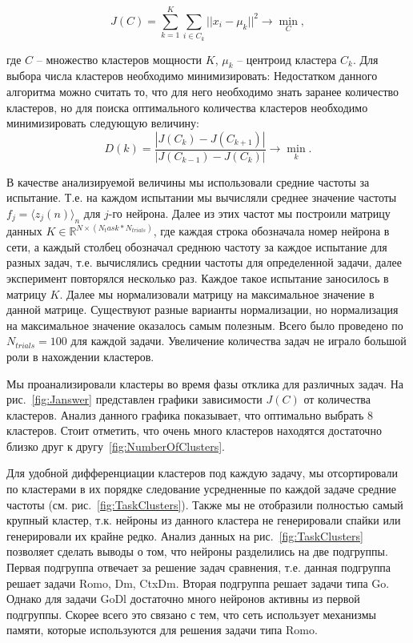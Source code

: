 \documentclass{article}
\begin{document}
\begin{equation}\label{eq:kMeans}
  J(C) = \sum_{k=1}^K \sum_{i \in C_k} ||x_i - \mu_k||^2 \rightarrow \min_C,
\end{equation}

где $C$ -- множество кластеров мощности $K$, $\mu_k$ -- центроид кластера $C_k$. Для выбора числа кластеров необходимо минимизировать:
Недостатком данного алгоритма можно считать то, что для него необходимо знать заранее количество кластеров, но для поиска оптимального количества кластеров необходимо минимизировать следующую величину:
\begin{equation}
  D(k) = \frac{|J(C_k) - J(C_{k + 1})|}{|J(C_{k-1}) - J(C_k)|} \rightarrow \min_k.
\end{equation}

В качестве анализируемой величины мы использовали средние частоты за испытание. Т.е. на каждом испытании мы вычисляли среднее значение частоты $f_j = \langle z_j(n) \rangle_n$ для $j$-го нейрона. Далее из этих частот мы построили матрицу данных $K \in \mathbb{R}^{N \times (N_task * N_{trials})}$, где каждая строка обозначала номер нейрона в сети, а каждый столбец обозначал среднюю частоту за каждое испытание для разных задач, т.е. вычислялись среднии частоты для определенной задачи, далее эксперимент повторялся несколько раз. Каждое такое испытание заносилось в матрицу $K$. Далее мы нормализовали матрицу на максимальное значение в данной матрице. Существуют разные варианты нормализации, но нормализация на максимальное значение оказалось самым полезным. Всего было проведено по $N_{trials} = 100$ для каждой задачи. Увеличение количества задач не играло большой роли в нахождении кластеров.

Мы проанализировали кластеры во время фазы отклика для различных задач. На рис.~\ref{fig:Janswer} представлен графики зависимости $J(C)$ от количества кластеров. Анализ данного графика показывает, что оптимально выбрать 8 кластеров. Стоит отметить, что очень много кластеров находятся достаточно близко друг к другу~\ref{fig:NumberOfClusters}.

Для удобной дифференциации кластеров под каждую задачу, мы отсортировали по кластерами в их порядке следование усредненные по каждой задаче средние частоты (см. рис.~\ref{fig:TaskClusters}). Также мы не отобразили полностью самый крупный кластер, т.к. нейроны из данного кластера не генерировали спайки или генерировали их крайне редко. Анализ данных на рис.~\ref{fig:TaskClusters} позволяет сделать выводы о том, что нейроны разделились на две подгруппы. Первая подгруппа отвечает за решение задач сравнения, т.е. данная подгруппа решает задачи Romo, Dm, CtxDm. Вторая подгруппа решает задачи типа Go. Однако для задачи GoDl достаточно много нейронов активны из первой подгруппы. Скорее всего это связано с тем, что сеть использует механизмы памяти, которые используются для решения задачи типа Romo.
\end{document}
